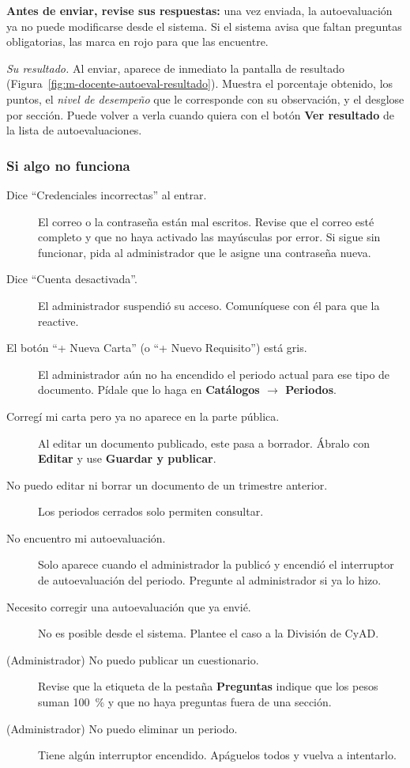\textbf{Antes de enviar, revise sus respuestas:} una vez enviada, la autoevaluación ya no puede modificarse desde el sistema. Si el sistema avisa que faltan preguntas obligatorias, las marca en rojo para que las encuentre.

\textit{Su resultado.} Al enviar, aparece de inmediato la pantalla de resultado (Figura~\ref{fig:m-docente-autoeval-resultado}). Muestra el porcentaje obtenido, los puntos, el \emph{nivel de desempeño} que le corresponde con su observación, y el desglose por sección. Puede volver a verla cuando quiera con el botón \textbf{Ver resultado} de la lista de autoevaluaciones.


\subsubsection{Si algo no funciona}\label{apx:manual-user:problemas}

\begin{description}
    \item[Dice ``Credenciales incorrectas'' al entrar.] El correo o la contraseña están mal escritos. Revise que el correo esté completo y que no haya activado las mayúsculas por error. Si sigue sin funcionar, pida al administrador que le asigne una contraseña nueva.
    \item[Dice ``Cuenta desactivada''.] El administrador suspendió su acceso. Comuníquese con él para que la reactive.
    \item[El botón ``+ Nueva Carta'' (o ``+ Nuevo Requisito'') está gris.] El administrador aún no ha encendido el periodo actual para ese tipo de documento. Pídale que lo haga en \textbf{Catálogos $\to$ Periodos}.
    \item[Corregí mi carta pero ya no aparece en la parte pública.] Al editar un documento publicado, este pasa a borrador. Ábralo con \textbf{Editar} y use \textbf{Guardar y publicar}.
    \item[No puedo editar ni borrar un documento de un trimestre anterior.] Los periodos cerrados solo permiten consultar.
    \item[No encuentro mi autoevaluación.] Solo aparece cuando el administrador la publicó y encendió el interruptor de autoevaluación del periodo. Pregunte al administrador si ya lo hizo.
    \item[Necesito corregir una autoevaluación que ya envié.] No es posible desde el sistema. Plantee el caso a la División de CyAD.
    \item[(Administrador) No puedo publicar un cuestionario.] Revise que la etiqueta de la pestaña \textbf{Preguntas} indique que los pesos suman 100~\% y que no haya preguntas fuera de una sección.
    \item[(Administrador) No puedo eliminar un periodo.] Tiene algún interruptor encendido. Apáguelos todos y vuelva a intentarlo.
\end{description}

